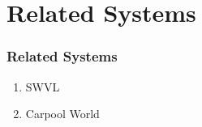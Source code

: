 \section{Related Systems}
\begin{frame}[allowframebreaks]
    \frametitle{Related Systems}

    \begin{enumerate}
        \item SWVL
        \item Carpool World
    \end{enumerate}

\end{frame}